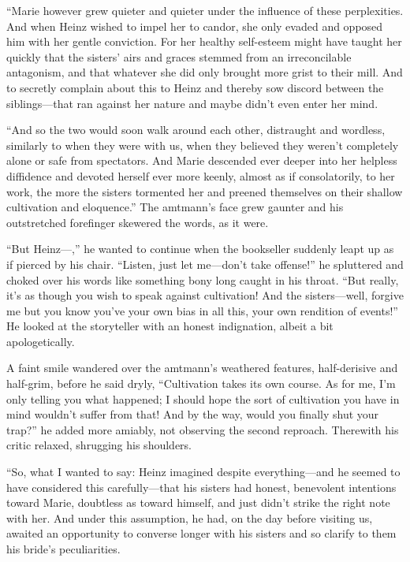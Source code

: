 \documentclass[12pt,a4paper]{article}
\begin{document}
“Marie however grew quieter and quieter under the influence of these perplexities. And when Heinz wished to impel her to candor, she only evaded and opposed him with her gentle conviction. For her healthy self-esteem might have taught her quickly that the sisters’ airs and graces stemmed from an irreconcilable antagonism, and that whatever she did only brought more grist to their mill. And to secretly complain about this to Heinz and thereby sow discord between the siblings—that ran against her nature and maybe didn’t even enter her mind.

“And so the two would soon walk around each other, distraught and wordless, similarly to when they were with us, when they believed they weren’t completely alone or safe from spectators. And Marie descended ever deeper into her helpless diffidence and devoted herself ever more keenly, almost as if consolatorily, to her work, the more the sisters tormented her and preened themselves on their shallow cultivation and eloquence.” The amtmann’s face grew gaunter and his outstretched forefinger skewered the words, as it were.

“But Heinz—,” he wanted to continue when the bookseller suddenly leapt up as if pierced by his chair. “Listen, just let me—don’t take offense!” he spluttered and choked over his words like something bony long caught in his throat. “But really, it’s as though you wish to speak against cultivation! And the sisters—well, forgive me but you know you’ve your own bias in all this, your own rendition of events!” He looked at the storyteller with an honest indignation, albeit a bit apologetically.

A faint smile wandered over the amtmann’s weathered features, half-derisive and half-grim, before he said dryly, “Cultivation takes its own course. As for me, I’m only telling you what happened; I should hope the sort of cultivation you have in mind wouldn’t suffer from that! And by the way, would you finally shut your trap?” he added more amiably, not observing the second reproach. Therewith his critic relaxed, shrugging his shoulders.

“So, what I wanted to say: Heinz imagined despite everything—and he seemed to have considered this carefully—that his sisters had honest, benevolent intentions toward Marie, doubtless as toward himself, and just didn’t strike the right note with her. And under this assumption, he had, on the day before visiting us, awaited an opportunity to converse longer with his sisters and so clarify to them his bride’s peculiarities.
\end{document}
